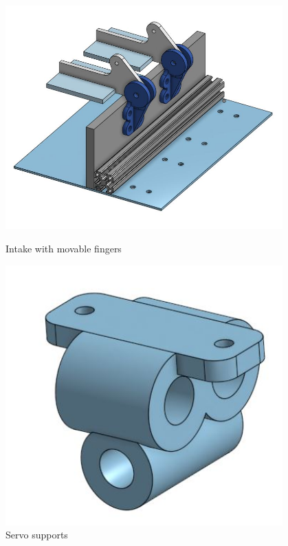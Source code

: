 \begin{figure}[ht]
\centering
\begin{minipage}[b]{.48\textwidth}
  \centering
  \includegraphics[width=0.95\textwidth]{Meetings/October/10-30-21/10-30-21_CAD_Figure4 - Nathan Forrer.JPG}
  \caption{Intake with movable fingers}
  \label{fig:pic3}
\end{minipage}%
\hfill%
\begin{minipage}[b]{.48\textwidth}
  \centering
  \includegraphics[width=0.95\textwidth]{Meetings/October/10-30-21/10-30-21_CAD_Figure5 - Nathan Forrer.JPG}
  \caption{Servo supports}
  \label{fig:pic4}
\end{minipage}
\end{figure}

